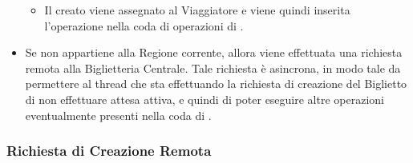\begin{itemize}
\begin {itemize}
\begin{itemize}
\begin{verbatim}
						\end{verbatim}
						\item $i$ viene incrementato di $Max\_Length$.
					\end{itemize} 
			\item Il  creato viene assegnato al Viaggiatore e viene quindi inserita l'operazione  nella coda di operazioni di .
			\end {itemize} 
		\item Se  non appartiene alla Regione corrente, allora viene effettuata una richiesta remota alla Biglietteria Centrale. Tale richiesta è asincrona, in modo tale da permettere al thread che sta effettuando la richiesta di creazione del Biglietto di non effettuare attesa attiva, e quindi di poter eseguire altre operazioni eventualmente presenti nella coda di .
	\end{itemize} 
	
	\subsubsection {Richiesta di Creazione Remota}
	
